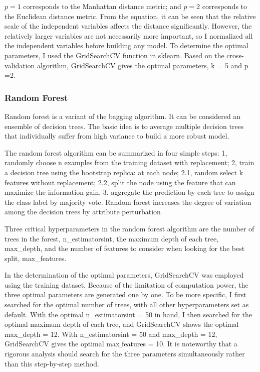 \documentclass[12pt]{article}
\begin{document}
\par $p=1$ corresponds to the Manhattan distance metric; and $p=2$ corresponds to the Euclidean distance metric. From the equation, it can be seen that the relative scale of the independent variables affects the distance significantly. However, the relatively larger variables are not necessarily more important, so I normalized all the independent variables before building any model.
To determine the optimal parameters, I used the GridSearchCV function in sklearn. Based on the cross-validation algorithm, GridSearchCV gives the optimal parameters, k = 5 and p =2.


\subsubsection{Random Forest}
Random forest is a variant of the bagging algorithm. It can be considered an ensemble of decision trees. The basic idea is to average multiple decision trees that individually suffer from high variance to build a more robust model.

The random forest algorithm can be summarized in four simple steps: 1, randomly choose n examples from the training dataset with replacement; 2, train a decision tree using the bootstrap replica: at each node; 2.1, random select k features without replacement; 2.2, split the node using the feature that can maximize the information gain. 3. aggregate the prediction by each tree to assign the class label by majority vote. Random forest increases the degree of variation among the decision trees by attribute perturbation

Three critical hyperparameters in the random forest algorithm are the number of trees in the forest, n\_estimatorsint, the maximum depth of each tree, max\_depth, and the number of features to consider when looking for the best split, max\_features.

In the determination of the optimal parameters, GridSearchCV was employed using the training dataset. Because of the limitation of computation power, the three optimal parameters are generated one by one. To be more specific, I first searched for the optimal number of trees, with all other hyperparameters set as default. With the optimal n\_estimatorsint = 50 in hand, I then searched for the optimal maximum depth of each tree, and GridSearchCV shows the optimal max\_depth = 12. With n\_estimatorsint = 50 and max\_depth = 12, GridSearchCV gives the optimal max$\_$features = 10. It is noteworthy that a rigorous analysis should search for the three parameters simultaneously rather than this step-by-step method.
\end{document}
